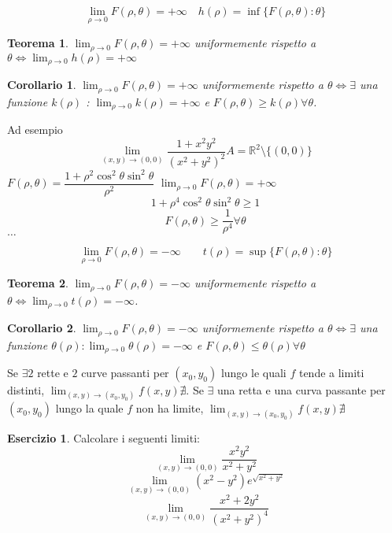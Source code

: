 \documentclass{article}
\theoremstyle{plain}
\newtheorem{thm}{Teorema}[section]
\newtheorem{cor}{Corollario}
\theoremstyle{definition}
\newtheorem{xca}[exmp]{Esercizio}
\theoremstyle{remark}
\begin{document}
\[\lim_{\rho\to0}F(\rho,\theta)=+\infty \quad h(\rho)=\inf\{F(\rho,\theta):\theta\}\]
\begin{bxthm}
\begin{thm}
    $\lim_{\rho\to0}F(\rho,\theta)=+\infty$ uniformemente rispetto a $\theta \iff \lim_{\rho\to0}h(\rho)=+\infty$
\end{thm}
\end{bxthm}
\begin{bxthm}
\begin{cor}
    $\lim_{\rho\to0}F(\rho,\theta)=+\infty$ uniformemente rispetto a $\theta \iff \exists$ una funzione $k(\rho)$ : $\lim_{\rho\to0}k(\rho)=+\infty$ e $F(\rho,\theta)\geq k(\rho)\forall\theta$.
\end{cor}
\end{bxthm}

Ad esempio 
\[\lim_{(x,y)\to(0,0)}\dfrac{1+x^2y^2}{(x^2+y^2)^2} A=\mathbb{R}^2\setminus\{(0,0)\}\]
$F(\rho,\theta)=\dfrac{1+\rho^2\cos^2\theta\sin^2\theta}{\rho^2}$
$\lim_{\rho\to0}F(\rho,\theta)=+\infty$
\[1+\rho^4\cos^2\theta\sin^2\theta\geq1\]
\[F(\rho,\theta)\geq\dfrac{1}{\rho^4}\forall\theta\]
$\dots$


\[\lim_{\rho\to0}F(\rho,\theta)=-\infty\quad\quad t(\rho)=\sup\{F(\rho,\theta):\theta\}\]
\begin{bxthm}
\begin{thm}
    $\lim_{\rho\to0}F(\rho,\theta)=-\infty$ uniformemente rispetto a $\theta \iff \lim_{\rho\to0}t(\rho)=-\infty$.
\end{thm}
\end{bxthm}
\begin{bxthm}
\begin{cor}
    $\lim_{\rho\to0}F(\rho,\theta)=-\infty$ uniformemente rispetto a $\theta \iff \exists$ una funzione $\theta(\rho):\lim_{\rho\to0}\theta(\rho)=-\infty$ e $F(\rho,\theta)\leq\theta(\rho)\forall\theta$
\end{cor}
\end{bxthm}

Se $\exists 2$ rette e $2$ curve passanti per $(x_0,y_0)$ lungo le quali $f$ tende a limiti distinti, $\lim_{(x,y)\to(x_0,y_0)}f(x,y)\nexists$.
Se $\exists$ una retta e una curva passante per $(x_0,y_0)$ lungo la quale $f$ non ha limite, $\lim_{(x,y)\to(x_0,y_0)}f(x,y)\nexists$

\begin{xca}
Calcolare i seguenti limiti:
\[\lim_{(x,y)\to(0,0)}\dfrac{x^2y^2}{x^2+y^2}\]
\[\lim_{(x,y)\to(0,0)}(x^2-y^2)e^{\sqrt{x^2+y^2}}\]
\[\lim_{(x,y)\to(0,0)}\dfrac{x^2+2y^2}{(x^2+y^2)^4}\]
\end{xca}
\end{document}
